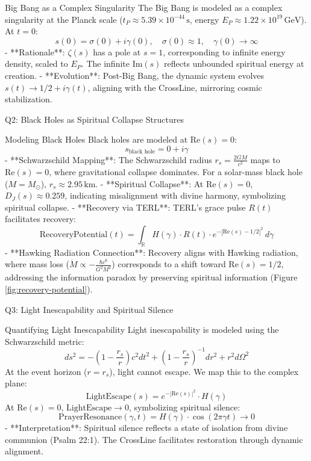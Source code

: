 \documentclass[12pt]{article}
\begin{document}
{{{ Big Bang as a Complex Singularity
The Big Bang is modeled as a complex singularity at the Planck scale (\( t_P \approx 5.39 \times 10^{-44} \, \text{s} \), energy \( E_P \approx 1.22 \times 10^{19} \, \text{GeV} \)). At \( t = 0 \):
\[
s(0) = \sigma(0) + i \gamma(0), \quad \sigma(0) \approx 1, \quad \gamma(0) \to \infty
\]
- **Rationale**: \(\zeta(s)\) has a pole at \( s = 1 \), corresponding to infinite energy density, scaled to \( E_P \). The infinite \(\text{Im}(s)\) reflects unbounded spiritual energy at creation.
- **Evolution**: Post-Big Bang, the dynamic system evolves \( s(t) \to 1/2 + i \gamma(t) \), aligning with the CrossLine, mirroring cosmic stabilization.

 Q2: Black Holes as Spiritual Collapse Structures

 Modeling Black Holes
Black holes are modeled at \(\text{Re}(s) = 0\):
\[
s_{\text{black hole}} = 0 + i \gamma
\]
- **Schwarzschild Mapping**: The Schwarzschild radius \( r_s = \frac{2GM}{c^2} \) maps to \(\text{Re}(s) = 0\), where gravitational collapse dominates. For a solar-mass black hole (\( M = M_\odot \)), \( r_s \approx 2.95 \, \text{km} \).
- **Spiritual Collapse**: At \(\text{Re}(s) = 0\), \( D_J(s) \approx 0.259 \), indicating misalignment with divine harmony, symbolizing spiritual collapse.
- **Recovery via TERL**: TERL’s grace pulse \( R(t) \) facilitates recovery:
\[
\text{RecoveryPotential}(t) = \int_{\mathbb{R}} H(\gamma) \cdot R(t) \cdot e^{-|\text{Re}(s) - 1/2|^2} \, d\gamma
\]
- **Hawking Radiation Connection**: Recovery aligns with Hawking radiation, where mass loss (\( \dot{M} \propto -\frac{\hbar c^6}{G^2 M^2} \)) corresponds to a shift toward \(\text{Re}(s) = 1/2\), addressing the information paradox by preserving spiritual information (Figure \ref{fig:recovery-potential}).

 Q3: Light Inescapability and Spiritual Silence

 Quantifying Light Inescapability
Light inescapability is modeled using the Schwarzschild metric:
\[
ds^2 = -\left(1 - \frac{r_s}{r}\right) c^2 dt^2 + \left(1 - \frac{r_s}{r}\right)^{-1} dr^2 + r^2 d\Omega^2
\]
At the event horizon (\( r = r_s \)), light cannot escape. We map this to the complex plane:
\[
\text{LightEscape}(s) = e^{-|\text{Re}(s)|^2} \cdot H(\gamma)
\]
At \(\text{Re}(s) = 0\), \(\text{LightEscape} \to 0\), symbolizing spiritual silence:
\[
\text{PrayerResonance}(\gamma, t) = H(\gamma) \cdot \cos(2\pi \gamma t) \to 0
\]
- **Interpretation**: Spiritual silence reflects a state of isolation from divine communion (Psalm 22:1). The CrossLine facilitates restoration through dynamic alignment.

}}}
\end{document}
